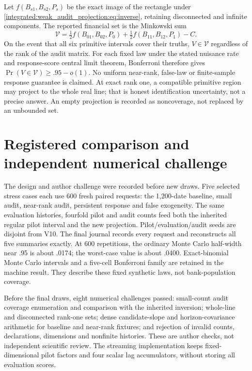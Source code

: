 Let $f(B_{s1},B_{s2},P_s)$ be the exact image of the rectangle under
\eqref{integrated:weak_audit_projection:eq:inverse}, retaining disconnected and infinite components. The
reported financial set is the Minkowski sum
\begin{equation}\label{integrated:weak_audit_projection:eq:set}
 \mathcal V=\tfrac12 f(B_{01},B_{02},P_0)
 +\tfrac12 f(B_{11},B_{12},P_1)-C.
\end{equation}
On the event that all six primitive intervals cover their truths, $V\in
\mathcal V$ regardless of the rank of the audit matrix. For each fixed law
under the stated nuisance rate and response-score central limit theorem,
Bonferroni therefore gives $\Pr(V\in\mathcal V)\geq .95-o(1)$.
No uniform near-rank, false-law or finite-sample response guarantee is
claimed. At exact rank one, a compatible primitive region may project to the
whole real line; that is honest identification uncertainty, not a precise
answer. An empty projection is recorded as noncoverage, not replaced by an
unbounded set.

\section{Registered comparison and independent numerical challenge}

The design and author challenge were recorded before new draws. Five selected
stress cases each use 600 fresh paired requests: the 1,200-date baseline,
small audit, near-rank audit, persistent response and false exogeneity. The
same evaluation histories, fourfold pilot and audit counts feed both the
inherited regular pilot interval and the new projection. Pilot/evaluation/audit
seeds are disjoint from V10. The final journal records every request and
reconstructs all five summaries exactly. At 600 repetitions, the ordinary
Monte Carlo half-width near .95 is about .0174; the worst-case value is about
.0400. Exact-binomial Monte Carlo intervals and a five-cell Bonferroni family
are retained in the machine result. They describe these fixed synthetic laws,
not bank-population coverage.

Before the final draws, eight numerical challenges passed: small-count audit
coverage enumeration and comparison with the inherited inversion; whole-line
and disconnected rank-one sets; dense candidate-slope and horizon-covariance
arithmetic for baseline and near-rank fixtures; and rejection of invalid
counts, declarations, dimensions and nonfinite histories. These are author
checks, not independent scientific review. The streaming implementation keeps
fixed-dimensional pilot factors and four scalar lag accumulators, without
storing all evaluation scores.

